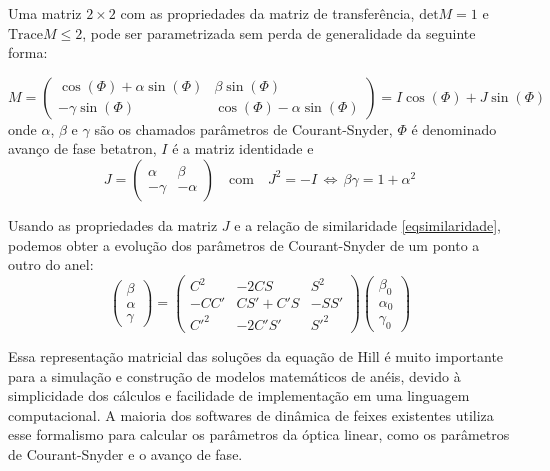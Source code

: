 Uma matriz $2\times2$ com as propriedades da matriz de transferência, $\mathrm{det}M=1$ e $\mathrm{Trace}M\leq 2$, pode ser parametrizada sem perda de generalidade da seguinte forma:

\begin{equation}
 M = \left(
\begin{array}{cc}
 \cos(\Phi) + \alpha \sin(\Phi)  & \beta \sin(\Phi) \\
 -\gamma \sin(\Phi) & \cos(\Phi) -\alpha \sin(\Phi)
\end{array} \right) = I \cos(\Phi) + J\sin(\Phi)
\end{equation}
onde $\alpha$, $\beta$ e $\gamma$ são os chamados parâmetros de Courant-Snyder, $\Phi$ é denominado avanço de fase betatron, $I$ é a matriz identidade e
\begin{equation}
 J= \left(\begin{array}{cc}
          \alpha  & \beta \\
          -\gamma & -\alpha
         \end{array} \right)
\quad \mathrm{com} \quad J^2=-I \, \Leftrightarrow 
\, \beta \gamma = 1+ \alpha^2
\end{equation}

Usando as propriedades da matriz $J$ e a relação de similaridade  \eqref{eqsimilaridade}, podemos obter a evolução dos parâmetros de Courant-Snyder de um ponto a outro do anel:
\begin{equation}\label{eqevolparcouder}
\left(\begin{array}{c}
       \beta \\ \alpha \\ \gamma
      \end{array}\right) = 
\left(\begin{array}{ccc}
       C^2    &   -2 C S      &  S^2   \\
       -C C'  &  C S' + C' S  &  -S S' \\
       C'^2   & -2 C' S'      &  S'^2
      \end{array}\right)
\left(\begin{array}{c}
       \beta_0 \\ \alpha_0 \\ \gamma_0
      \end{array}\right)
\end{equation}

Essa representação matricial das soluções da equação de Hill é muito importante para a simulação e construção de modelos matemáticos de anéis, devido à simplicidade dos cálculos e facilidade de implementação em uma linguagem computacional.
A maioria dos softwares de dinâmica de feixes existentes utiliza esse formalismo para calcular os parâmetros da óptica linear, como os parâmetros de Courant-Snyder e o avanço de fase.

